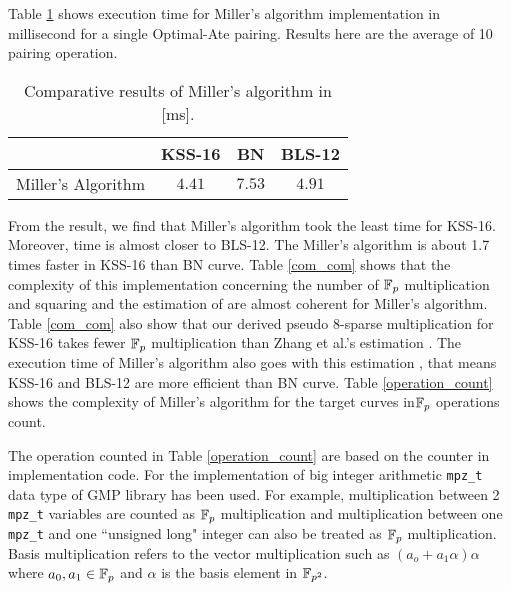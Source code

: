 \renewcommand{\baselinestretch}{1.0}
Table \ref{result_table} shows execution time for Miller's algorithm implementation in millisecond for a single Optimal-Ate pairing. Results here are the average of 10 pairing operation.
\renewcommand{\baselinestretch}{1.5}
\begin{table}[h!]
	\centering
	\caption{Comparative results of Miller's algorithm in [ms].}
	\label{result_table}
	\begin{tabular}{l|c|c|c|}
		\cline{2-4}
		& KSS-16 & \quad BN   \quad  & BLS-12 \\ \hline
		\multicolumn{1}{|l|}{Miller's Algorithm} & $4.41$ & $7.53$ & $4.91$ \\ \hline
	\end{tabular}
\end{table}
\renewcommand{\baselinestretch}{1.0}
From the result, we find that Miller's algorithm took the least time for  KSS-16. 
Moreover, time is almost closer to BLS-12.
The Miller's algorithm is about 1.7 times faster in KSS-16 than BN curve. 
Table \ref{com_com} shows that the complexity of this implementation concerning the number of ${\mathbb{F}}_{p}$ multiplication and squaring and the estimation of \cite{EPRINT:BarDuq17} are almost coherent for Miller's algorithm. 
Table \ref{com_com} also show that our derived pseudo 8-sparse multiplication for KSS-16 takes fewer ${\mathbb{F}}_{p}$ multiplication than Zhang et al.'s estimation \cite{INDOCRYPT:ZhaLin12}.
The execution time of Miller's algorithm also goes with this estimation \cite{EPRINT:BarDuq17}, that means KSS-16 and BLS-12 are more efficient than BN curve.
Table \ref{operation_count} shows the complexity of Miller's algorithm for the target curves in${\mathbb{F}}_{p}$ operations count.

The operation counted in Table \ref{operation_count} are based on the counter in implementation code. For the implementation of big integer arithmetic  \texttt{mpz\_t} data type of GMP \cite{gmp} library has been used. 
For example, multiplication between 2 \texttt{mpz\_t} variables are counted as ${\mathbb{F}}_{p}$  multiplication and  multiplication between one \texttt{mpz\_t} and one ``unsigned long" integer can also be treated as $\mathbb{F}_p$ multiplication.
Basis multiplication refers to the vector multiplication such as $(a_o+a_1\alpha)\alpha$ where $a_0,a_1\in {\mathbb{F}}_{p} $ and $\alpha$ is the basis element in $\mathbb{F}_{p^2}$. 

